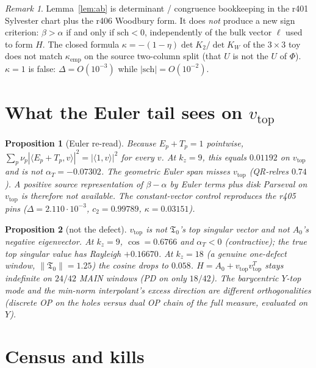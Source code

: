 \documentclass[11pt]{article}
\newtheorem{prop}{Proposition}
\theoremstyle{remark}
\newtheorem{remark}{Remark}
\newcommand{\Tfrak}{\mathfrak{T}}
\newcommand{\sch}{\mathrm{sch}}
\begin{document}
\begin{remark}
Lemma~\ref{lem:ab} is determinant / congruence bookkeeping
in the r401 Sylvester chart plus the r406 Woodbury form.
It does \emph{not} produce a new sign criterion:
$\beta>\alpha$ if and only if $\sch<0$, independently of
the bulk vector $\ell$ used to form $H$.
The closed formula
$\kappa=-(1-\eta)\det K_2/\det K_W$ of the $3\times 3$ toy
does not match $\kappa_{\mathrm{emp}}$ on the source two-column
split (that $U$ is not the $U$ of $\Phi$).
$\kappa=1$ is false: $\Delta=O(10^{-3})$ while
$|\sch|=O(10^{-2})$.
\end{remark}

\section{What the Euler tail sees on $v_{\mathrm{top}}$}

\begin{prop}[Euler re-read]\label{prop:euler}
Because $E_p+T_p=1$ pointwise,
$\sum_p\nu_p|\langle E_p+T_p,v\rangle|^2=|\langle 1,v\rangle|^2$
for every $v$.
At $k_z=9$, this equals $0.01192$ on $v_{\mathrm{top}}$ and
is \emph{not} $\alpha_T=-0.07302$.
The geometric Euler span misses $v_{\mathrm{top}}$
(QR-relres $0.74$).
A positive source representation of $\beta-\alpha$ by Euler
terms plus disk Parseval on $v_{\mathrm{top}}$ is therefore
not available.
The constant-vector control reproduces the r405 pins
($\Delta=2.110\cdot 10^{-3}$, $c_2=0.99789$,
$\kappa=0.03151$).
\end{prop}

\begin{prop}[not the defect]\label{prop:notdef}
$v_{\mathrm{top}}$ is not $\Tfrak_0$'s top singular vector
and not $A_0$'s negative eigenvector.
At $k_z=9$, $\cos=0.6766$ and $\alpha_T<0$ (contractive);
the true top singular value has Rayleigh $+0.16670$.
At $k_z=18$ (a genuine one-defect window,
$\|\Tfrak_0\|=1.25$) the cosine drops to $0.058$.
$H=A_0+v_{\mathrm{top}}v_{\mathrm{top}}^T$ stays indefinite
on $24/42$ MAIN windows (PD on only $18/42$).
The barycentric $Y$-top mode and the min-norm interpolant's
excess direction are different orthogonalities
(discrete OP on the holes versus dual OP chain of the full
measure, evaluated on $Y$).
\end{prop}

\section{Census and kills}
\end{document}
